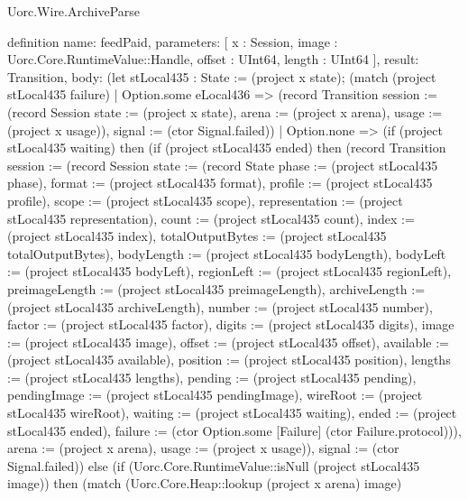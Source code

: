 \begin{lexlean}{Uorc.Wire.ArchiveParse}
\begin{semanticmodule}
definition{
  name: feedPaid,
  parameters: [
    x : Session,
    image : Uorc.Core.RuntimeValue::Handle,
    offset : UInt64,
    length : UInt64
  ],
  result: Transition,
  body: (let stLocal435 : State := (project x state); (match (project stLocal435 failure)
    | Option.some eLocal436 => (record Transition {session := (record Session {state := (project x state), arena := (project x arena), usage := (project x usage)}), signal := (ctor Signal.failed)})
    | Option.none => (if (project stLocal435 waiting) then (if (project stLocal435 ended) then (record Transition {session := (record Session {state := (record State {phase := (project stLocal435 phase), format := (project stLocal435 format), profile := (project stLocal435 profile), scope := (project stLocal435 scope), representation := (project stLocal435 representation), count := (project stLocal435 count), index := (project stLocal435 index), totalOutputBytes := (project stLocal435 totalOutputBytes), bodyLength := (project stLocal435 bodyLength), bodyLeft := (project stLocal435 bodyLeft), regionLeft := (project stLocal435 regionLeft), preimageLength := (project stLocal435 preimageLength), archiveLength := (project stLocal435 archiveLength), number := (project stLocal435 number), factor := (project stLocal435 factor), digits := (project stLocal435 digits), image := (project stLocal435 image), offset := (project stLocal435 offset), available := (project stLocal435 available), position := (project stLocal435 position), lengths := (project stLocal435 lengths), pending := (project stLocal435 pending), pendingImage := (project stLocal435 pendingImage), wireRoot := (project stLocal435 wireRoot), waiting := (project stLocal435 waiting), ended := (project stLocal435 ended), failure := (ctor Option.some [Failure] (ctor Failure.protocol))}), arena := (project x arena), usage := (project x usage)}), signal := (ctor Signal.failed)}) else (if (Uorc.Core.RuntimeValue::isNull (project stLocal435 image)) then (match (Uorc.Core.Heap::lookup (project x arena) image)
}
\end{semanticmodule}
\end{lexlean}
